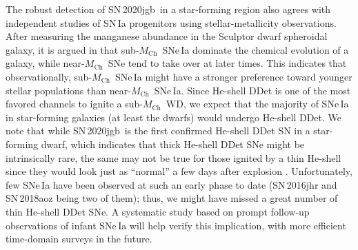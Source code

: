 \documentclass[twocolumn]{aastex631}
\newcommand{\sn}{SN\,2020jgb}
\newcommand{\Mch}{$M_\mathrm{Ch}$}
\begin{document}
\begin{CJK*}{UTF8}{gbsn}
The robust detection of \sn\ in a star-forming region also agrees with independent studies of SN\,Ia progenitors using stellar-metallicity observations. After measuring the manganese abundance in the Sculptor dwarf spheroidal galaxy, it is argued in \citet{de_los_reyes_manganese_2020} that sub-\Mch\ SNe\,Ia dominate the chemical evolution of a galaxy, while near-\Mch\ SNe tend to take over at later times. This indicates that observationally, sub-\Mch\ SNe\,Ia might have a stronger preference toward younger stellar populations than near-\Mch\ SNe\,Ia.
Since He-shell DDet is one of the most favored channels to ignite a sub-\Mch\ WD, we expect that the majority of SNe\,Ia in star-forming galaxies (at least the dwarfs) would undergo He-shell DDet. We note that while \sn\ is the first confirmed He-shell DDet SN in a star-forming dwarf, which indicates that thick He-shell DDet SNe might be intrinsically rare, the same may not be true for those ignited by a thin He-shell since they would look just as  ``normal'' a few days after explosion \citep{Magee_2021}. Unfortunately, few SNe\,Ia have been observed at such an early phase to date (SN\,2016jhr and SN\,2018aoz being two of them); thus, we might have missed a great number of thin He-shell DDet SNe. A systematic study based on prompt follow-up observations of infant SNe\,Ia will help verify this implication, with more efficient time-domain surveys in the future.


\end{CJK*}
\end{document}
